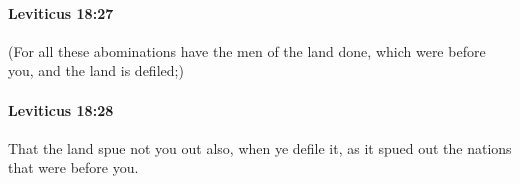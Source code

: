 		\paragraph{Leviticus 18:27} %
			\label{LEVITICUS-18-27}

			(For all these abominations have the men of the land done, which were before you, and the land is defiled;)


		\paragraph{Leviticus 18:28} %
			\label{LEVITICUS-18-28}

			That the land spue not you out also, when ye defile it, as it spued out the nations that were before you.


